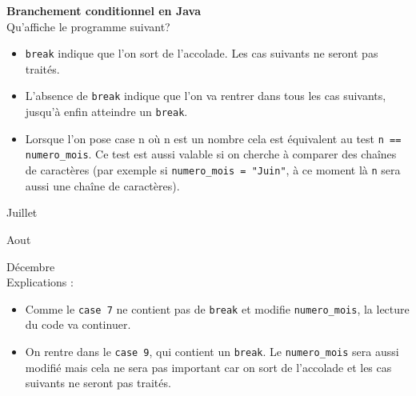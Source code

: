  \begin{Exercice}[10 minutes] \textbf{Branchement conditionnel en Java}\\
   Qu'affiche le programme suivant? 
   
   
    
     \begin{conseil}
          \begin{itemize}
             \item \lstinline{break} indique que l'on sort de l'accolade. Les cas suivants ne seront pas traités.
             \item L'absence de \lstinline{break} indique que l'on va rentrer dans tous les cas suivants, jusqu'à enfin atteindre un \lstinline{break}.
             \item Lorsque l'on pose case n où n est un nombre cela est équivalent au test \lstinline{n == numero_mois}. Ce test est aussi valable si on cherche à comparer des chaînes de caractères (par exemple si \lstinline{numero_mois = "Juin"}, à ce moment là \lstinline{n} sera aussi une chaîne de caractères).
          \end{itemize}
         
     \end{conseil}
     \begin{solution}
     
     Juillet
     
    Aout
    
    Décembre \\
    
    Explications : \\
    
    \begin{itemize}
             \item Comme le \lstinline{case 7} ne contient pas de \lstinline{break} et modifie \lstinline{numero_mois}, la lecture du code va continuer.
             \item On rentre dans le \lstinline{case 9}, qui contient un \lstinline{break}. Le \lstinline{numero_mois} sera aussi modifié mais cela ne sera pas important car on sort de l'accolade et les cas suivants ne seront pas traités.
       \end{itemize}
     \end{solution}   
 \end{Exercice}


